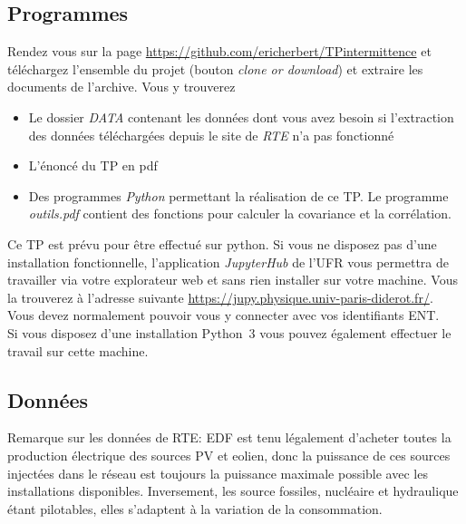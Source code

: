 \documentclass[12pt,a4]{article}
\newcommand{\tmtextit}[1]{{\itshape{#1}}}
\begin{document}
\subsection{Programmes}

Rendez vous sur la page \newline
\href{https://github.com/ericherbert/TPintermittence}{https://github.com/ericherbert/TPintermittence} et téléchargez l'ensemble du projet (bouton \tmtextit{clone or download}) et extraire les
documents de l'archive. Vous y trouverez
\begin{itemize}
  \item Le dossier \tmtextit{DATA} contenant les données dont vous avez   besoin si l'extraction des données téléchargées depuis le site de   \tmtextit{RTE} n'a pas fonctionné
  
  \item L'énoncé du TP en pdf
  
  \item Des programmes \tmtextit{Python} permettant la réalisation de ce TP. Le programme \textit{outils.pdf} contient des fonctions pour calculer la covariance et la corrélation.
\end{itemize}
Ce TP est prévu pour être effectué sur python. Si vous ne disposez pas d'une installation fonctionnelle, l'application \tmtextit{JupyterHub} de l'UFR vous permettra de travailler via votre explorateur web et sans rien installer sur votre machine. Vous la trouverez à l'adresse suivante
\href{https://jupy.physique.univ-paris-diderot.fr/}{https://jupy.physique.univ-paris-diderot.fr/}. Vous devez normalement pouvoir vous y connecter avec vos identifiants ENT.\\
Si vous disposez d'une installation Python~3 vous pouvez également effectuer le travail sur cette machine.


\subsection{Données}

Remarque sur les données de RTE: EDF est tenu légalement d'acheter toutes la
production électrique des sources PV et eolien, donc la puissance de ces sources injectées dans le réseau est toujours la puissance maximale possible avec les installations disponibles. Inversement, les source fossiles, nucléaire et hydraulique étant pilotables, elles s'adaptent à la variation de la consommation.
\end{document}
